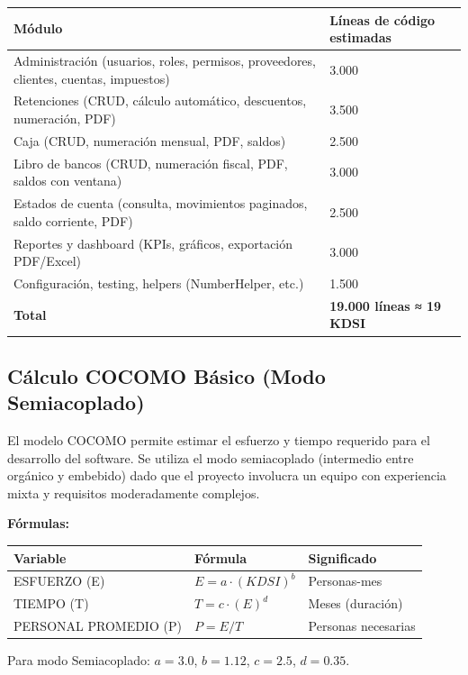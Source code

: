 \documentclass[stu]{apa7}
\begin{document}
\begin{longtable}{|L{5cm}|C{4cm}|}
\hline
{}
\textbf{Módulo} & \textbf{Líneas de código estimadas} \\
\hline
Administración (usuarios, roles, permisos, proveedores, clientes, cuentas, impuestos) & 3.000 \\
\hline
Retenciones (CRUD, cálculo automático, descuentos, numeración, PDF) & 3.500 \\
\hline
Caja (CRUD, numeración mensual, PDF, saldos) & 2.500 \\
\hline
Libro de bancos (CRUD, numeración fiscal, PDF, saldos con ventana) & 3.000 \\
\hline
Estados de cuenta (consulta, movimientos paginados, saldo corriente, PDF) & 2.500 \\
\hline
Reportes y dashboard (KPIs, gráficos, exportación PDF/Excel) & 3.000 \\
\hline
Configuración, testing, helpers (NumberHelper, etc.) & 1.500 \\
\hline
{}
\textbf{Total} & \textbf{19.000 líneas ≈ 19 KDSI} \\
\hline
\end{longtable}

\subsection{Cálculo COCOMO Básico (Modo Semiacoplado)}

El modelo COCOMO permite estimar el esfuerzo y tiempo requerido para el desarrollo del software. Se utiliza el modo semiacoplado (intermedio entre orgánico y embebido) dado que el proyecto involucra un equipo con experiencia mixta y requisitos moderadamente complejos.

\textbf{Fórmulas:}

\begin{longtable}{|C{3cm}|C{4cm}|C{5cm}|}
\hline
{}
\textbf{Variable} & \textbf{Fórmula} & \textbf{Significado} \\
\hline
ESFUERZO (E) & $E = a \cdot (KDSI)^b$ & Personas-mes \\
\hline
TIEMPO (T) & $T = c \cdot (E)^d$ & Meses (duración) \\
\hline
PERSONAL PROMEDIO (P) & $P = E / T$ & Personas necesarias \\
\hline
\end{longtable}

Para modo Semiacoplado: $a = 3.0$, $b = 1.12$, $c = 2.5$, $d = 0.35$.
\end{document}

